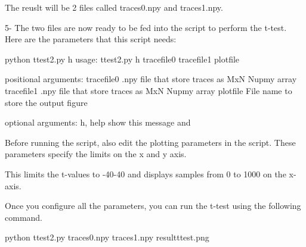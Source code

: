 \documentclass[letterpaper,10pt,english]{sphinxmanual}
\begin{document}
The reuslt will be 2 files called traces0.npy and traces1.npy.

5- The two files are now ready to be fed into the  script to perform the t-test. Here are the parameters that this script needs:

\begin{sphinxVerbatim}[commandchars=\\\{\}]
\PYGZdl{} python t\PYGZhy{}test2.py \PYGZhy{}h
usage: t\PYGZhy{}test2.py \PYG{o}{[}\PYGZhy{}h\PYG{o}{]} trace\PYGZus{}file0 trace\PYGZus{}file1 plot\PYGZus{}file

positional arguments:
trace\PYGZus{}file0  .npy file that store traces as MxN Nupmy array
trace\PYGZus{}file1  .npy file that store traces as MxN Nupmy array
plot\PYGZus{}file    File name to store the output figure

optional arguments:
\PYGZhy{}h, \PYGZhy{}\PYGZhy{}help   show this  message and 
\end{sphinxVerbatim}

Before running the script, also edit the plotting parameters in the script. These parameters specify the limits on the x and y axis.

\begin{sphinxVerbatim}[commandchars=\\\{\}]
  
  
  
  
\end{sphinxVerbatim}

This limits the t-values to -40-40 and displays samples from 0 to 1000 on the x-axis.

Once you configure all the parameters, you can run the t-test using the following command.

\begin{sphinxVerbatim}[commandchars=\\\{\}]
python t\PYGZhy{}test2.py traces0.npy traces1.npy result\PYGZus{}t\PYGZus{}test.png
\end{sphinxVerbatim}
\end{document}
